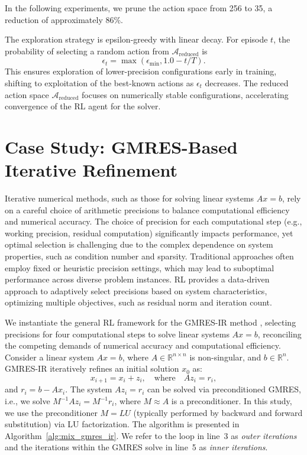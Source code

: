\documentclass[Afour,sageh,times]{sagej}
\theoremstyle{plain}
\theoremstyle{definition}
\begin{document}
In the following experiments, we prune the action space from 256 to 35, a reduction of approximately 86\%.

The exploration strategy is epsilon-greedy with linear decay. For episode $t$, the probability of selecting a random action from $\mathcal{A}_{\text{reduced}}$ is
\begin{equation}
\epsilon_t = \max(\epsilon_{\text{min}}, 1.0 - t / T).
\end{equation}
This ensures exploration of lower-precision configurations early in training, shifting to exploitation of the best-known actions as $\epsilon_t$ decreases. The reduced action space $\mathcal{A}_{\text{reduced}}$ focuses on numerically stable configurations, accelerating convergence of the RL agent for the solver.


\section{Case Study: GMRES-Based Iterative Refinement}
\label{sec:gmres_application}


Iterative numerical methods, such as those for solving linear systems $Ax = b$, rely on a careful choice of arithmetic precisions to balance computational efficiency and numerical accuracy. The choice of precision for each computational step (e.g., working precision, residual computation) significantly impacts performance, yet optimal selection is challenging due to the complex dependence on system properties, such as condition number and sparsity. Traditional approaches often employ fixed or heuristic precision settings, which may lead to suboptimal performance across diverse problem instances. RL provides a data-driven approach to adaptively select precisions based on system characteristics, optimizing multiple objectives, such as residual norm and iteration count.

We instantiate the general RL framework for the GMRES-IR method \citep{doi:10.1137/17M1140819}, selecting precisions for four computational steps to solve linear systems $Ax = b$, reconciling the competing demands of numerical accuracy and computational efficiency. Consider a linear system $Ax = b$, where $A \in \mathbb{R}^{n \times n}$ is non-singular, and $b \in \mathbb{R}^n$. GMRES-IR iteratively refines an initial solution $x_0$ as:
\begin{equation*}
x_{i+1} = x_i + z_i, \quad \text{where} \quad Az_i = r_i,
\end{equation*}
and $r_i = b-Ax_i$. The system $Az_i=r_i$ can be solved via preconditioned GMRES, i.e., we solve $M^{-1}Az_i = M^{-1}r_i$, where $M \approx A$ is a preconditioner. In this study, we use the preconditioner $M =LU$ (typically performed by backward and forward substitution) via LU factorization.  The algorithm is presented in Algorithm~\ref{alg:mix_gmres_ir}. We refer to the loop in  line~3 as \emph{outer iterations} and the iterations within the GMRES solve in line~5 as \emph{inner iterations}.
\end{document}

